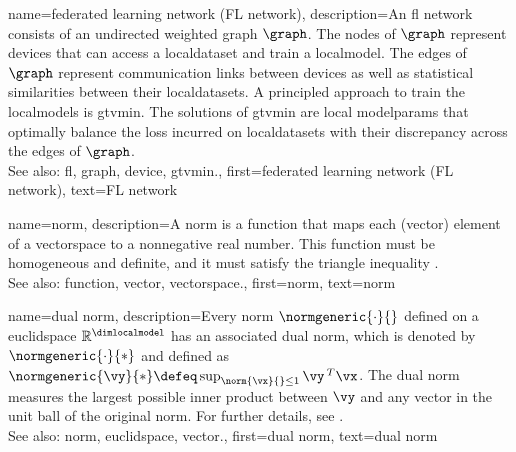 {name={federated learning network (FL network)},
	description={An \gls{fl} network consists of 
		an undirected weighted \gls{graph} $\graph$. The nodes of $\graph$ represent \glspl{device} 
		that can access a \gls{localdataset} and train a \gls{localmodel}. The edges of $\graph$ represent 
		communication links between \glspl{device} as well as statistical similarities between their \glspl{localdataset}. 
		A principled approach to train the \glspl{localmodel} is \gls{gtvmin}. The solutions of \gls{gtvmin} are local 
		\glspl{modelparam} that optimally balance the \gls{loss} incurred on \glspl{localdataset} with their \gls{discrepancy} 
		across the edges of $\graph$.
	    			\\ 
		See also: \gls{fl}, \gls{graph}, \gls{device}, \gls{gtvmin}.},
	first={federated learning network (FL network)},
	text={FL network} 
}

{name={norm},
	description={A norm is a \gls{function} that maps each (\gls{vector}) element 
		of a \gls{vectorspace} to a nonnegative real number. This \gls{function} must be 
		homogeneous and definite, and it must satisfy the triangle inequality \cite{HornMatAnalysis}.
		\\
		See also: \gls{function}, \gls{vector}, \gls{vectorspace}.},
	first={norm},
	text={norm} 
}

{name={dual norm},
	description={Every \gls{norm} $\normgeneric{\cdot}{}$ defined on a \gls{euclidspace} $\mathbb{R}^{\dimlocalmodel}$ 
		has an associated dual \gls{norm}, which is denoted by $\normgeneric{\cdot}{*}$ and defined as 
		$\normgeneric{\vy}{*} \defeq \sup_{\norm{\vx}{} \le 1} \vy\,^{T} \vx$. 
		The dual \gls{norm} measures the largest possible inner product between $\vy$ 
		and any \gls{vector} in the unit ball of the original \gls{norm}. For further details, see 
		\cite[Sec.~A.1.6]{BoydConvexBook}.
					\\ 
		See also: \gls{norm}, \gls{euclidspace}, \gls{vector}.},
	first={dual norm},
	text={dual norm}
}

